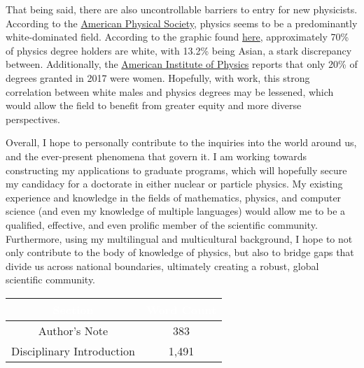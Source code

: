 \begin{justify}
  \hspace{.5in} That being said, there are also uncontrollable barriers to entry for new physicists. According to the \href{https://www.aps.org/}{American Physical Society}, physics seems to be a predominantly white-dominated field. According to the graphic found \href{https://www.aps.org/programs/education/statistics/degreesbyrace.cfm}{here}, approximately 70\% of physics degree holders are white, with 13.2\% being Asian, a stark discrepancy between. Additionally, the \href{https://www.aip.org/}{American Institute of Physics} reports that only 20\% of degrees granted in 2017 were women. Hopefully, with work, this strong correlation between white males and physics degrees may be lessened, which would allow the field to benefit from greater equity and more diverse perspectives.

  \hspace{.5in} Overall, I hope to personally contribute to the inquiries into the world around us, and the ever-present phenomena that govern it. I am working towards constructing my applications to graduate programs, which will hopefully secure my candidacy for a doctorate in either nuclear or particle physics. My existing experience and knowledge in the fields of mathematics, physics, and computer science (and even my knowledge of multiple languages) would allow me to be a qualified, effective, and even prolific member of the scientific community. Furthermore, using my multilingual and multicultural background, I hope to not only contribute to the body of knowledge of physics, but also to bridge gaps that divide us across national boundaries, ultimately creating a robust, global scientific community.

\end{justify} 

\begin{center}
  \begin{tcolorbox}[colback=blue!5,colframe=blue!15,width=4in]
    \begin{center}
    \begin{tabular}{|c|c|}
      \hline
      \cellcolor{black} \textcolor{white}{\textbf{Section}} & \cellcolor{black} \textcolor{white}{\textbf{Word Count}}\\
      \hline
      \rowcolor{white} Author's Note & 383\\
      \hline
      \rowcolor{white} Disciplinary Introduction & 1,491\\
      \hline
    \end{tabular}
    \end{center}
  \end{tcolorbox}
\end{center}



